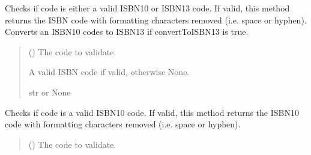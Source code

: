 \documentclass[letterpaper,10pt,english]{sphinxmanual}
\begin{document}
\begin{fulllineitems}
\begin{fulllineitems}
\label{\detokenize{apache_commons_validator_python.routines:apache_commons_validator_python.routines.isbn_validator.ISBNValidator.validate}}
\pysigstartsignatures
{}
\pysigstopsignatures
\sphinxAtStartPar
Checks if code is either a valid ISBN\sphinxhyphen{}10 or ISBN\sphinxhyphen{}13 code. If valid, this
method returns the ISBN code with formatting characters removed (i.e. space or
hyphen). Converts an ISBN\sphinxhyphen{}10 codes to ISBN\sphinxhyphen{}13 if convertToISBN13 is true.
\begin{quote}\begin{description}
\sphinxAtStartPar
{} () \textendash{} The code to validate.

\sphinxAtStartPar
A valid ISBN code if valid, otherwise None.

\sphinxAtStartPar
str or None

\end{description}\end{quote}

\end{fulllineitems}


\begin{fulllineitems}
\label{\detokenize{apache_commons_validator_python.routines:apache_commons_validator_python.routines.isbn_validator.ISBNValidator.validate_isbn10}}
\pysigstartsignatures
{}
\pysigstopsignatures
\sphinxAtStartPar
Checks if code is a valid ISBN\sphinxhyphen{}10 code. If valid, this method returns the
ISBN\sphinxhyphen{}10 code with formatting characters removed (i.e. space or hyphen).
\begin{quote}\begin{description}
\sphinxAtStartPar
{} () \textendash{} The code to validate.


\end{description}
\end{quote}
\end{fulllineitems}
\end{fulllineitems}
\end{document}
